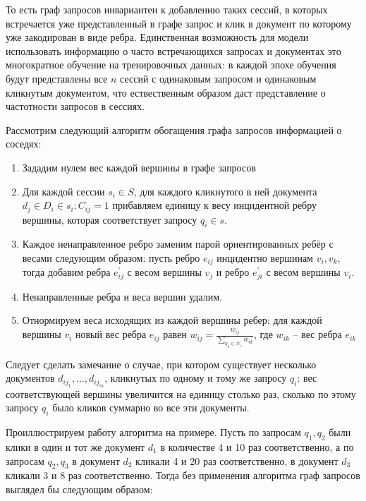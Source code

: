 \documentclass[diploma]{nanolab2015}
\begin{document}
То есть граф запросов инвариантен к добавлению таких сессий, в которых встречается уже представленный в графе запрос и клик в документ по которому уже закодирован в виде ребра. Единственная возможность для модели использовать информацию о часто встречающихся запросах и документах это многократное обучение на тренировочных данных: в каждой эпохе обучения будут представлены все $n$ сессий с одинаковым запросом и одинаковым кликнутым документом, что ествественным образом даст представление о частотности запросов в сессиях.

Рассмотрим следующий алгоритм обогащения графа запросов информацией о соседях:
\begin{enumerate}
    [
      leftmargin=*,
      label={Шаг \arabic*.}
    ]
  \item Зададим нулем вес каждой вершины в графе запросов
  \item Для каждой сессии $s_i \in S$, для каждого кликнутого в ней документа $d_j \in D_i \in s_i : C_{ij} = 1$ прибавляем единицу к весу инцидентной ребру вершины, которая соответствует запросу $q_i \in s$.
  \item Каждое ненаправленное ребро заменим парой ориентированных ребёр с весами следующим образом: пусть ребро $e_{ij}$ инцидентно вершинам $v_i, v_k$, тогда добавим ребра $e_{ij}^{'}$ с весом вершины $v_j$ и ребро $e_{ji}^{'}$ с весом вершины $v_i$.
  \item Ненаправленные ребра и веса вершин удалим.
  \item Отнормируем веса исходящих из каждой вершины ребер: для каждой вершины $v_i$ новый вес ребра $e_{ij}$ равен $ w_{ij} = \frac{w_{ij}}{\sum_{q_k \in \mathcal{N}_i} w_{ik} }$, где $w_{ik}$ -- вес ребра $e_{ik}$
\end{enumerate}

Следует сделать замечание о случае, при котором существует несколько документов $d_{ij_{1}}, \dots , d_{ij_{m}}$, кликнутых по одному и тому же запросу $q_i$: вес соответствующей вершины увеличится на единицу столько раз, сколько по этому запросу $q_i$ было кликов суммарно во все эти документы.

Проиллюстрируем работу алгоритма на примере. Пусть по запросам $q_1, q_2$ были клики в один и тот же документ $d_1$ в количестве 4 и 10 раз соответственно, а по запросам $q_2, q_3$ в документ $d_2$ кликали 4 и 20 раз соответственно, в документ $d_3$ кликали 3 и 8 раз соответственно. Тогда без применения алгоритма граф запросов выглядел бы следующим образом:
\begin{center}
\end{center}
\end{document}
